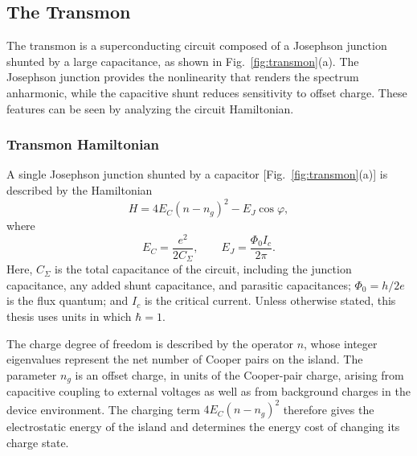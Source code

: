 \subsection{The Transmon}
\label{sec:transmon}
\begingroup
\makeatletter
\let\ttl@addcontentsline\@gobbletwo
\makeatother
The transmon is a superconducting circuit composed of a Josephson junction shunted by a large capacitance, as shown in Fig.~\ref{fig:transmon}(a). The Josephson junction provides the nonlinearity that renders the spectrum anharmonic, while the capacitive shunt reduces sensitivity to offset charge. These features can be seen by analyzing the circuit Hamiltonian.

\subsubsection{Transmon Hamiltonian}

A single Josephson junction shunted by a capacitor [Fig.~\ref{fig:transmon}(a)] is described by the Hamiltonian
\begin{equation}
    H = 4E_C (n - n_g)^2 - E_J \cos \varphi,
\end{equation}
where
\begin{equation}
    E_C = \frac{e^2}{2C_\Sigma},
    \qquad
    E_J = \frac{\Phi_0 I_c}{2\pi}.
\end{equation}
Here, \(C_\Sigma\) is the total capacitance of the circuit, including the junction capacitance, any added shunt capacitance, and parasitic capacitances; \(\Phi_0 = h/2e\) is the flux quantum; and \(I_c\) is the critical current. Unless otherwise stated, this thesis uses units in which \(\hbar = 1\). 

The charge degree of freedom is described by the operator \(n\), whose integer eigenvalues represent the net number of Cooper pairs on the island. The parameter \(n_g\) is an offset charge, in units of the Cooper-pair charge, arising from capacitive coupling to external voltages as well as from background charges in the device environment. The charging term \(4E_C (n-n_g)^2\) therefore gives the electrostatic energy of the island and determines the energy cost of changing its charge state.

